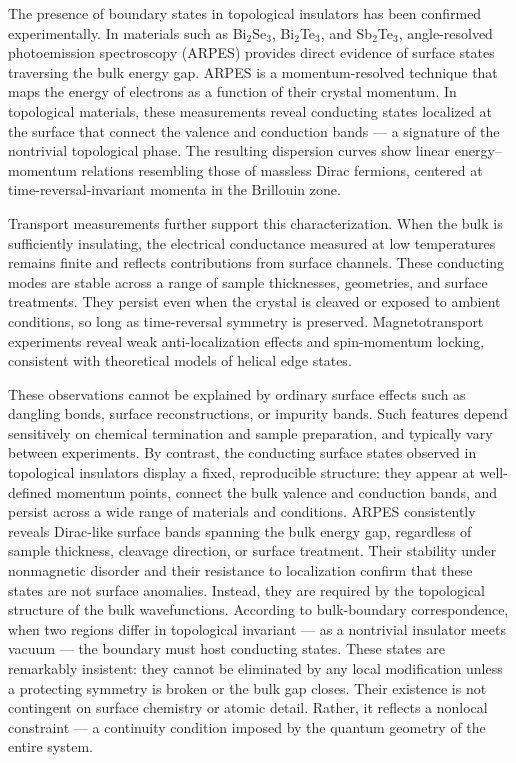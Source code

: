 The presence of boundary states in topological insulators has been confirmed experimentally. In materials such as Bi\(_2\)Se\(_3\), Bi\(_2\)Te\(_3\), and Sb\(_2\)Te\(_3\), angle-resolved photoemission spectroscopy (ARPES) provides direct evidence of surface states traversing the bulk energy gap. ARPES is a momentum-resolved technique that maps the energy of electrons as a function of their crystal momentum. In topological materials, these measurements reveal conducting states localized at the surface that connect the valence and conduction bands — a signature of the nontrivial topological phase. The resulting dispersion curves show linear energy–momentum relations resembling those of massless Dirac fermions, centered at time-reversal-invariant momenta in the Brillouin zone.

Transport measurements further support this characterization. When the bulk is sufficiently insulating, the electrical conductance measured at low temperatures remains finite and reflects contributions from surface channels. These conducting modes are stable across a range of sample thicknesses, geometries, and surface treatments. They persist even when the crystal is cleaved or exposed to ambient conditions, so long as time-reversal symmetry is preserved. Magnetotransport experiments reveal weak anti-localization effects and spin-momentum locking, consistent with theoretical models of helical edge states.

These observations cannot be explained by ordinary surface effects such as dangling bonds, surface reconstructions, or impurity bands. Such features depend sensitively on chemical termination and sample preparation, and typically vary between experiments. By contrast, the conducting surface states observed in topological insulators display a fixed, reproducible structure: they appear at well-defined momentum points, connect the bulk valence and conduction bands, and persist across a wide range of materials and conditions. ARPES consistently reveals Dirac-like surface bands spanning the bulk energy gap, regardless of sample thickness, cleavage direction, or surface treatment. Their stability under nonmagnetic disorder and their resistance to localization confirm that these states are not surface anomalies. Instead, they are required by the topological structure of the bulk wavefunctions. According to bulk-boundary correspondence, when two regions differ in topological invariant — as a nontrivial insulator meets vacuum — the boundary must host conducting states. These states are remarkably insistent: they cannot be eliminated by any local modification unless a protecting symmetry is broken or the bulk gap closes. Their existence is not contingent on surface chemistry or atomic detail. Rather, it reflects a nonlocal constraint — a continuity condition imposed by the quantum geometry of the entire system.

